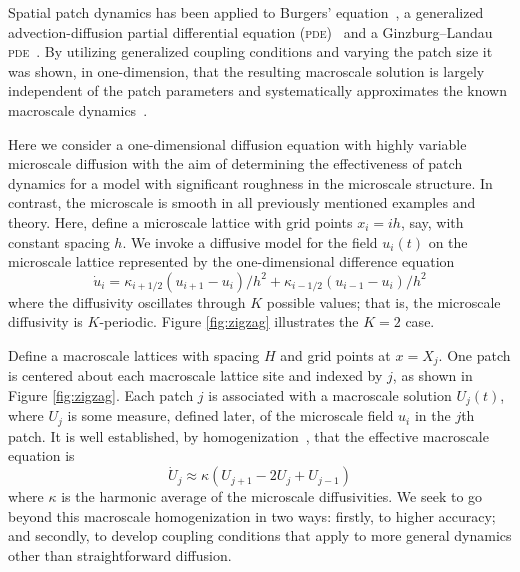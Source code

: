 \documentclass[12pt,a4paper]{article}
\begin{document}
Spatial patch dynamics has been applied to Burgers' equation~\cite{Roberts01}, a generalized advection-diffusion partial differential equation (\textsc{pde})~\cite{Roberts03} and a Ginzburg--Landau \textsc{pde}~\cite{Roberts11}. By utilizing generalized coupling conditions and varying the patch size it was shown, in one-dimension, that the resulting macroscale solution is largely  independent of the patch parameters and systematically approximates the known macroscale dynamics~\cite{Roberts07}. 

Here we consider a one-dimensional diffusion equation with highly variable microscale diffusion with the aim of determining the effectiveness of patch dynamics for a model with significant roughness in the microscale structure. In contrast, the microscale is smooth in all previously mentioned examples and theory. Here, define a microscale lattice with grid points $x_i=ih$, say, with constant spacing $h$. We invoke a diffusive model for the field $u_i(t)$ on the microscale lattice represented by the one-dimensional difference equation
\begin{equation}
\dot{u}_i=\kappa_{i+1/2}(u_{i+1}-u_i)/h^2+\kappa_{i-1/2}(u_{i-1}-u_i)/h^2\label{eq:pde}
\end{equation}
where the diffusivity oscillates through $K$ possible values; that is, the microscale diffusivity is $K$-periodic. Figure \ref{fig:zigzag} illustrates the $K=2$ case. 

Define a macroscale lattices with spacing $H$ and grid points at $x=X_j$. One patch is centered about each macroscale lattice site and indexed by $j$, as shown in Figure \ref{fig:zigzag}. Each patch $j$ is associated with a macroscale solution $U_j(t)$, where $U_j$ is some measure, defined later, of the microscale field $u_i$ in the $j$th patch. It is well established, by homogenization~\cite{Knapek98}, that the effective macroscale equation is
\begin{equation}
\dot{U}_j\approx \kappa(U_{j+1}-2U_j+U_{j-1})
\end{equation}
where $\kappa$ is the harmonic average of the microscale diffusivities. We seek to go beyond this macroscale homogenization in two ways: firstly, to higher accuracy; and secondly, to develop coupling conditions that apply to more general dynamics other than straightforward diffusion. 
\end{document}
